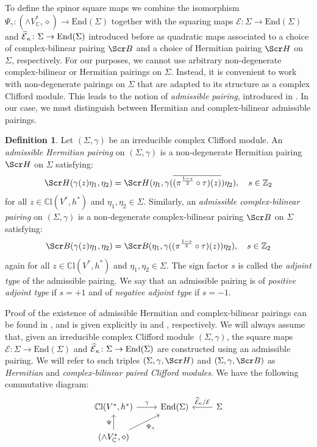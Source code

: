 \documentclass[10pt,a4paper,twoside,reqno]{amsart}
\theoremstyle{plain}
\theoremstyle{definition}
\newtheorem{definition}[thm]{Definition}
\theoremstyle{remark}
\newcommand{\End}{\mathrm{End}}
\def\Z{\mathbb{Z}}
\def\C{\mathbb{C}}
\def\scB{\Scr B}
\def\scS{\Scr H}
\def\cE{\mathcal{E}}
\def\hcE{\smash{\widehat{\mathcal{E}}}}
\def\mCl{\mathbb{C}\mathrm{l}}
\begin{document}
To define the spinor square maps we combine the isomorphism $\Psi_\gamma\colon(\wedge V^*_\C,\diamond)\to\End(\Sigma)$ together with the squaring maps $\cE\colon\Sigma\to\End(\Sigma)$ and $\hcE_\kappa\colon\Sigma\to\End(\Sigma)$ introduced before as quadratic maps associated to a choice of complex-bilinear pairing $\scB$ and a choice of Hermitian pairing $\scS$ on $\Sigma$, respectively. For our purposes, we cannot use arbitrary non-degenerate complex-bilinear or Hermitian pairings on $\Sigma$. Instead, it is convenient to work with non-degenerate pairings on $\Sigma$ that are adapted to its structure as a complex Clifford module. This leads to the notion of \emph{admissible pairing}, introduced in \cite{AC97,ACDVP05}. In our case, we must distinguish between Hermitian and complex-bilinear admissible pairings.

\begin{definition}\label{def:admissible_pairing}
    Let $(\Sigma,\gamma)$ be an irreducible complex Clifford module. An \emph{admissible Hermitian pairing} on $(\Sigma,\gamma)$ is a non-degenerate Hermitian pairing $\scS$ on $\Sigma$ satisfying: $$\scS(\gamma(z)\eta_1,\eta_2)=\scS(\eta_1,\gamma(\overline{(\pi^{\frac{1-s}{2}}\circ\tau)(z)})\eta_2),\quad s\in\Z_2$$ for all $z\in\mCl(V^*,h^*)$ and $\eta_1,\eta_2\in\Sigma$. Similarly, an \emph{admissible complex-bilinear pairing} on $(\Sigma,\gamma)$ is a non-degenerate complex-bilinear pairing $\scB$ on $\Sigma$ satisfying: $$\scB(\gamma(z)\eta_1,\eta_2)=\scB(\eta_1,\gamma((\pi^{\frac{1-s}{2}}\circ\tau)(z))\eta_2),\quad s\in\mathbb{Z}_2$$ again for all $z\in\mCl(V^*,h^*)$ and $\eta_1,\eta_2\in\Sigma$. The sign factor $s$ is called the \emph{adjoint type} of the admissible pairing. We say that an admissible pairing is of \emph{positive adjoint type} if $s=+1$ and of \emph{negative adjoint type} if $s=-1$.
\end{definition}

Proof of the existence of admissible Hermitian and complex-bilinear pairings can be found in \cite{AC97,ACDVP05,HarveyBook,Mei13}, and is given explicitly in \cite[Prop.\ 3.9]{Algebraic_Complex_Square_2025} and \cite[Prop.\ 3.18]{Algebraic_Complex_Square_2025}, respectively. We will always assume that, given an irreducible complex Clifford module $(\Sigma,\gamma)$, the square maps $\cE\colon\Sigma\to\End(\Sigma)$ and $\hcE_\kappa\colon\Sigma\to\End(\Sigma)$ are constructed using an admissible pairing. We will refer to such triples $(\Sigma, \gamma ,\scS)$ and $(\Sigma, \gamma ,\scB)$ as \emph{Hermitian} and \emph{complex-bilinear paired Clifford modules}. We have the following commutative diagram:
\begin{equation*}
\begin{tikzcd}
{\mathbb{C}\mathrm{l}(V^*,h^*)} \arrow[r, "\gamma"]  & \mathrm{End}(\Sigma) & \Sigma \arrow[l, " \widehat{\mathcal{E}}_\kappa / \mathcal{E}"'] \\
(\wedge V^*_{\mathbb{C}},\diamond) \arrow[u, "\Psi"] \arrow[ru, "\Psi_\gamma"'] &                      &             
\end{tikzcd}
\end{equation*}
\end{document}
